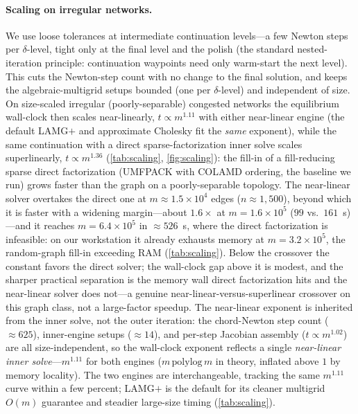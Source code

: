 \documentclass[ijoc]{informs3}
\begin{document}
\paragraph{Scaling on irregular networks.}
We use loose tolerances at intermediate continuation levels---a few Newton steps per $\delta$-level, tight only
at the final level and the polish (the standard nested-iteration principle: continuation waypoints need only
warm-start the next level). This cuts the Newton-step count with no change to the final solution, and keeps the
algebraic-multigrid setups bounded (one per $\delta$-level) and independent of size. On size-scaled irregular
(poorly-separable) congested networks the equilibrium wall-clock then scales near-linearly, $t\propto m^{1.11}$
with either near-linear engine (the default LAMG$+$ and approximate Cholesky fit the \emph{same} exponent), while
the same continuation with a direct sparse-factorization inner solve scales superlinearly, $t\propto m^{1.36}$
(\cref{tab:scaling}, \cref{fig:scaling}): the fill-in of a fill-reducing sparse direct factorization (UMFPACK with
COLAMD ordering, the baseline we run) grows faster than the graph on a poorly-separable topology. The near-linear
solver overtakes the direct one at $m\approx1.5\times10^{4}$ edges ($n\approx1{,}500$), beyond which it is faster
with a widening margin---about $1.6\times$ at $m=1.6\times10^5$ ($99$ vs.\ $161$~s)---and it reaches
$m=6.4\times10^5$ in ${\approx}526$~s, where the direct factorization is infeasible: on our workstation it already
exhausts memory at $m=3.2\times10^5$, the random-graph fill-in exceeding RAM (\cref{tab:scaling}). Below the
crossover the constant favors the direct solver; the wall-clock gap above it is modest, and the sharper practical
separation is the memory wall direct factorization hits and the near-linear solver does not---a genuine
near-linear-versus-superlinear crossover on this graph class, not a large-factor speedup.
The near-linear exponent is inherited from the inner solve, not the outer iteration: the chord-Newton step count
($\approx\!625$), inner-engine setups ($\approx\!14$), and per-step Jacobian assembly ($t\propto m^{1.02}$) are
all size-independent, so the wall-clock exponent reflects a single \emph{near-linear inner solve}---$m^{1.11}$
for both engines ($m\,\mathrm{polylog}\,m$ in theory, inflated above $1$ by memory locality). The two engines are
interchangeable, tracking the same $m^{1.11}$ curve within a few percent; LAMG$+$ is the default for its cleaner
multigrid $O(m)$ guarantee and steadier large-size timing (\cref{tab:scaling}).
\end{document}

